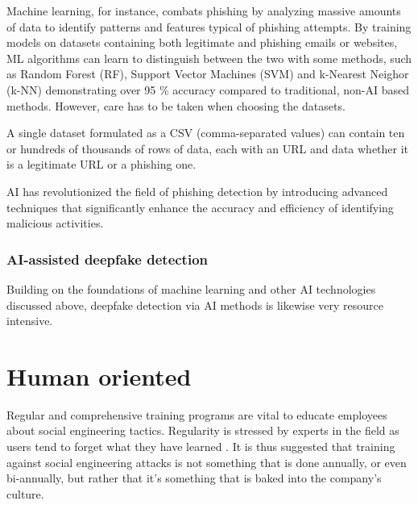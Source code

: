 Machine learning, for instance, combats phishing by analyzing massive amounts of data to identify patterns and features typical of phishing attempts. By training models on datasets containing both legitimate and phishing emails or websites, ML algorithms can learn to distinguish between the two with some methods, such as Random Forest (RF), Support Vector Machines (SVM) and k-Nearest Neighor (k-NN) demonstrating over 95 \% accuracy compared to traditional, non-AI based methods. However, care has to be taken when choosing the datasets.

A single dataset formulated as a CSV (comma-separated values) can contain ten or hundreds of thousands of rows of data, each with an URL and data whether it is a legitimate URL or a phishing one.



AI has revolutionized the field of phishing detection by introducing advanced techniques that significantly enhance the accuracy and efficiency of identifying malicious activities.

\subsubsection{AI-assisted deepfake detection}

Building on the foundations of machine learning and other AI technologies discussed above, deepfake detection via AI methods is likewise very resource intensive.

















\section{Human oriented}
\begin{comment}
    
    - The best defense against SE attacks is an educated, conscious user
    - User education should be continuous and not a one-off event

\end{comment}

Regular and comprehensive training programs are vital to educate employees about social engineering tactics. Regularity is stressed by experts in the field as users tend to forget what they have learned \citep{hadnagySocialEngineering2018, mitnickArtDeceptionControlling2003}. It is thus suggested that training against social engineering attacks is not something that is done annually, or even bi-annually, but rather that it's something that is baked into the company's culture.

